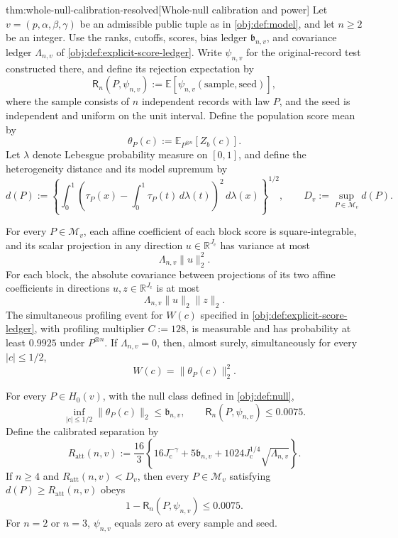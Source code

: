 \begin{theoremv}{thm:whole-null-calibration-resolved}[Whole-null calibration and power]
Let \(v=(p,\alpha,\beta,\gamma)\) be an admissible public tuple as in \cref{obj:def:model}, and let \(n\ge2\) be an integer. Use the ranks, cutoffs, scores, bias ledger \(\mathfrak b_{n,v}\), and covariance ledger \(\Lambda_{n,v}\) of \cref{obj:def:explicit-score-ledger}. Write \(\psi_{n,v}\) for the original-record test constructed there, and define its rejection expectation by
\[
\mathsf R_n(P,\psi_{n,v})
:=\mathbb E\!\left[\psi_{n,v}(\text{sample},\text{seed})\right],
\]
where the sample consists of \(n\) independent records with law \(P\), and the seed is independent and uniform on the unit interval. Define the population score mean by
\[
\theta_P(c):=\mathbb E_{P^{\otimes n}}[Z_b(c)].
\]
Let \(\lambda\) denote Lebesgue probability measure on \([0,1]\), and define the heterogeneity distance and its model supremum by
\[
d(P):=
\left\{\int_0^1
\left(\tau_P(x)-\int_0^1\tau_P(t)\,d\lambda(t)\right)^2
\,d\lambda(x)\right\}^{1/2},
\qquad
D_v:=\sup_{P\in\mathcal M_v}d(P).
\]

For every \(P\in\mathcal M_v\), each affine coefficient of each block score is square-integrable, and its scalar projection in any direction \(u\in\mathbb R^{J_{\mathrm c}}\) has variance at most
\[
\Lambda_{n,v}\|u\|_2^2.
\]
For each block, the absolute covariance between projections of its two affine coefficients in directions \(u,z\in\mathbb R^{J_{\mathrm c}}\) is at most
\[
\Lambda_{n,v}\|u\|_2\|z\|_2.
\]
The simultaneous profiling event for \(W(c)\) specified in \cref{obj:def:explicit-score-ledger}, with profiling multiplier \(C:=128\), is measurable and has probability at least \(0.9925\) under \(P^{\otimes n}\). If \(\Lambda_{n,v}=0\), then, almost surely, simultaneously for every \(|c|\le1/2\),
\[
W(c)=\|\theta_P(c)\|_2^2.
\]

For every \(P\in H_0(v)\), with the null class defined in \cref{obj:def:null},
\[
\inf_{|c|\le1/2}\|\theta_P(c)\|_2\le\mathfrak b_{n,v},
\qquad
\mathsf R_n(P,\psi_{n,v})\le0.0075.
\]
Define the calibrated separation by
\[
R_{\mathrm{att}}(n,v)
:=\frac{16}{3}
\left\{
16J_{\mathrm c}^{-\gamma}
+5\mathfrak b_{n,v}
+1024J_{\mathrm c}^{1/4}\sqrt{\Lambda_{n,v}}
\right\}.
\]
If \(n\ge4\) and \(R_{\mathrm{att}}(n,v)<D_v\), then every \(P\in\mathcal M_v\) satisfying \(d(P)\ge R_{\mathrm{att}}(n,v)\) obeys
\[
1-\mathsf R_n(P,\psi_{n,v})\le0.0075.
\]
For \(n=2\) or \(n=3\), \(\psi_{n,v}\) equals zero at every sample and seed.
\end{theoremv}

